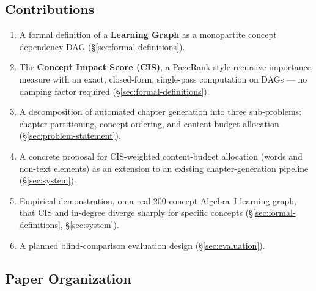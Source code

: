 \subsection{Contributions}
\begin{enumerate}
    \item A formal definition of a \textbf{Learning Graph} as a monopartite concept
          dependency DAG (\S\ref{sec:formal-definitions}).
    \item The \textbf{Concept Impact Score (CIS)}, a PageRank-style recursive
          importance measure with an exact, closed-form, single-pass computation on
          DAGs --- no damping factor required (\S\ref{sec:formal-definitions}).
    \item A decomposition of automated chapter generation into three sub-problems:
          chapter partitioning, concept ordering, and content-budget allocation
          (\S\ref{sec:problem-statement}).
    \item A concrete proposal for CIS-weighted content-budget allocation (words and
          non-text elements) as an extension to an existing chapter-generation
          pipeline (\S\ref{sec:system}).
    \item Empirical demonstration, on a real 200-concept Algebra~I learning graph,
          that CIS and in-degree diverge sharply for specific concepts
          (\S\ref{sec:formal-definitions}, \S\ref{sec:system}).
    \item A planned blind-comparison evaluation design (\S\ref{sec:evaluation}).
\end{enumerate}

\subsection{Paper Organization}
